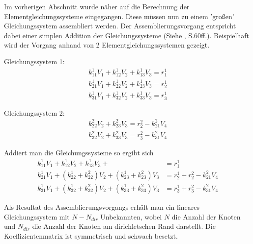 Im vorherigen Abschnitt wurde näher auf die Berechnung der Elementgleichungssysteme eingegangen. Diese müssen nun zu einem 'großen' Gleichungssystem assembliert werden. Der Assemblierungsvorgang entspricht dabei einer simplen Addition der Gleichungssysteme (Siehe \cite{SMS_VO_Skript}, S.60ff.). Beispielhaft wird der Vorgang anhand von 2 Elementgleichungssystemen gezeigt.

Gleichungssystem 1:
\begin{align*}
k_{11}^1 V_1 + k_{12}^1 V_2 + k_{13}^1 V_3 = r_1^1\\
k_{21}^1 V_1 + k_{22}^1 V_2 + k_{23}^1 V_3 = r_2^1\\
k_{31}^1 V_1 + k_{32}^1 V_2 + k_{33}^1 V_3 = r_3^1
\end{align*}


Gleichungssystem 2:
\begin{align*}
k_{22}^2 V_2 + k_{23}^2 V_3 = r_2^2 - k_{21}^2 V_4\\
k_{32}^2 V_2 + k_{33}^2 V_3 = r_3^2 - k_{31}^2 V_4
\end{align*}

Addiert man die Gleichungssysteme so ergibt sich
\begin{align}
k_{11}^1 V_1 + k_{12}^1 V_2 + k_{13}^1 V_3 +  &= r_1^1\\
k_{21}^1 V_1 + (k_{22}^1 +  k_{22}^2) V_2 + (k_{23}^1 + k_{23}^2) V_3 &= r_2^1 + r_2^2 - k_{21}^2 V_4 \nonumber\\
k_{31}^1 V_1 + (k_{32}^1 + k_{32}^2)  V_2 + ( k_{33}^1 + k_{33}^2) V_3 &= r_3^1 + r_3^2 - k_{31}^2 V_4 \nonumber
\end{align}

Als Resultat des Assemblierungsvorgangs erhält man ein lineares Gleichungssystem mit $N - N_{dir}$ Unbekannten, wobei $N$ die Anzahl der Knoten und $N_{dir}$ die Anzahl der Knoten am dirichletschen Rand darstellt. Die Koeffizientenmatrix ist symmetrisch und schwach besetzt.
\newline

